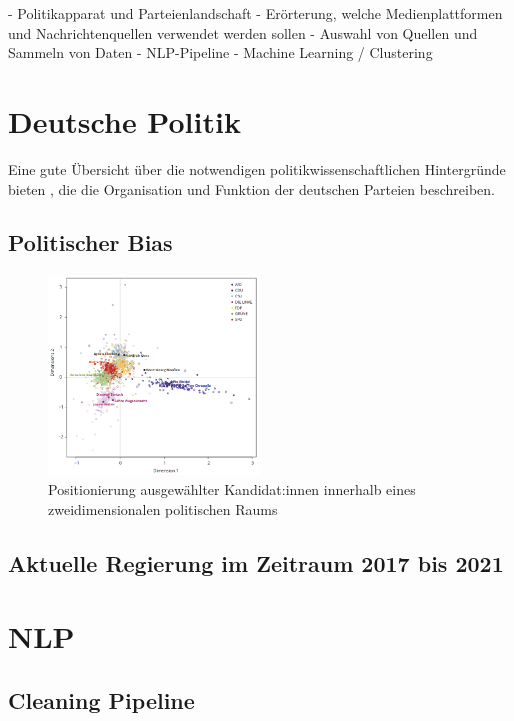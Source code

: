 -   Politikapparat und Parteienlandschaft
-   Erörterung, welche Medienplattformen und Nachrichtenquellen verwendet werden sollen
-   Auswahl von Quellen und Sammeln von Daten
-   NLP-Pipeline
-   Machine Learning / Clustering

\section{Deutsche Politik}
Eine gute Übersicht über die notwendigen politikwissenschaftlichen Hintergründe bieten \textcite{bukow_innerparteiliche_2013}, die die Organisation und Funktion der deutschen Parteien beschreiben.

\subsection{Politischer Bias}

\begin{figure}[H]
    \centering
    \includegraphics[width=0.5\textwidth]{data/images/positionierung_ausgewaehlter_kandidaten.png}
    \caption[Positionierung ausgewählter Kandidat:innen]{Positionierung ausgewählter Kandidat:innen innerhalb eines zweidimensionalen politischen Raums \autocite{saltzer_bundestagswahl_2022}} \label{fig:positionierungAusgewaehlterKanidaten}
\end{figure}

\subsection{Aktuelle Regierung im Zeitraum 2017 bis 2021}

\section{NLP}

\subsection{Cleaning Pipeline}

